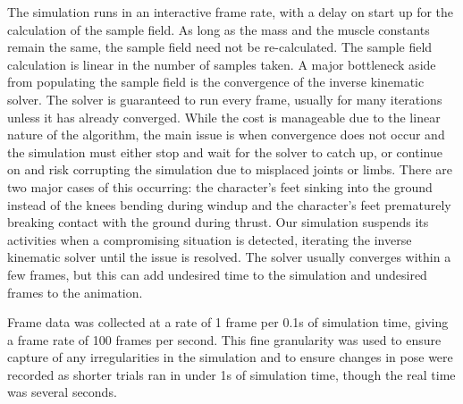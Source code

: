 The simulation runs in an interactive frame rate, with a delay on start up for the calculation of the sample field.  As long as the mass and the muscle constants remain the same, the sample field need not be re-calculated.  The sample field calculation is linear in the number of samples taken.  A major bottleneck aside from populating the sample field is the convergence of the inverse kinematic solver.  The solver is guaranteed to run every frame, usually for many iterations unless it has already converged.  While the cost is manageable due to the linear nature of the algorithm, the main issue is when convergence does not occur and the simulation must either stop and wait for the solver to catch up, or continue on and risk corrupting the simulation due to misplaced joints or limbs.  There are two major cases of this occurring: the character's feet sinking into the ground instead of the knees bending during windup and the character's feet prematurely breaking contact with the ground during thrust.  Our simulation suspends its activities when a compromising situation is detected, iterating the inverse kinematic solver until the issue is resolved.  The solver usually converges within a few frames, but this can add undesired time to the simulation and undesired frames to the animation.

Frame data was collected at a rate of 1 frame per 0.1s of simulation time, giving a frame rate of 100 frames per second.  This fine granularity was used to ensure capture of any irregularities in the simulation and to ensure changes in pose were recorded as shorter trials ran in under 1s of simulation time, though the real time was several seconds.  

